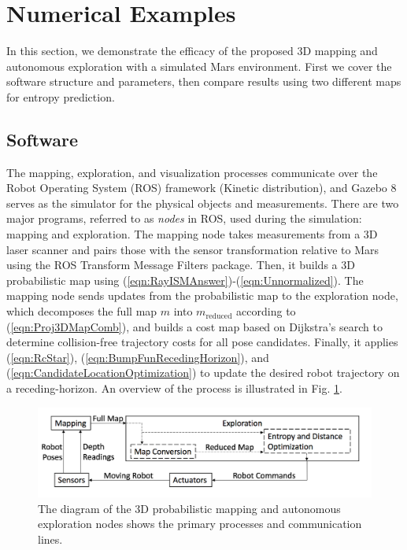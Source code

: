 \documentclass[conf]{new-aiaa}
\newcommand{\refeqn}[1]{(\ref{eqn:#1})}
\begin{document}
\section{Numerical Examples}
\label{sec:NumExamples}

In this section, we demonstrate the efficacy of the proposed 3D mapping and autonomous exploration with a simulated Mars environment. First we cover the software structure and parameters, then compare results using two different maps for entropy prediction.


\subsection{Software}

The mapping, exploration, and visualization processes communicate over the Robot Operating System (ROS) framework (Kinetic distribution), and Gazebo 8 serves as the simulator for the physical objects and measurements. There are two major programs, referred to as \emph{nodes} in ROS, used during the simulation: mapping and exploration. The mapping node takes measurements from a 3D laser scanner and pairs those with the sensor transformation relative to Mars using the ROS Transform Message Filters package. Then, it builds a 3D probabilistic map using \refeqn{RayISMAnswer}-\refeqn{Unnormalized}. The mapping node sends updates from the probabilistic map to the exploration node, which decomposes the full map $m$ into $ m_\text{reduced}$ according to \refeqn{Proj3DMapComb}, and builds a cost map based on Dijkstra's search to determine collision-free trajectory costs for all pose candidates. Finally, it applies \refeqn{RcStar}, \refeqn{BumpFunRecedingHorizon}, and \refeqn{CandidateLocationOptimization} to update the desired robot trajectory on a receding-horizon. An overview of the process is illustrated in Fig. \ref{fig:NodesDiagram}.

	\begin{figure}
		\centerline{
			\includegraphics[width=0.8\columnwidth]{node_diagram_3D_mars.png}
		}
		\caption{The diagram of the 3D probabilistic mapping and autonomous exploration nodes shows the primary processes and communication lines.}
		\label{fig:NodesDiagram}
	\end{figure}
	
\end{document}
